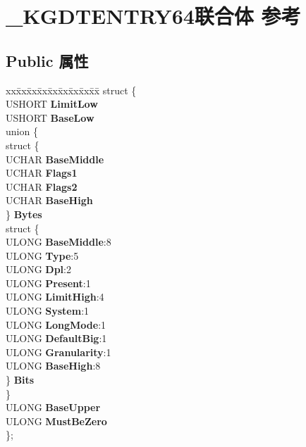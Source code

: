 \hypertarget{union___k_g_d_t_e_n_t_r_y64}{}\section{\+\_\+\+K\+G\+D\+T\+E\+N\+T\+R\+Y64联合体 参考}
\label{union___k_g_d_t_e_n_t_r_y64}
\subsection*{Public 属性}
\begin{DoxyCompactItemize}
\item 
\mbox{\label{union___k_g_d_t_e_n_t_r_y64_a58d7f2994f7a91284bcfc198b6ea5be6}} 
\begin{tabbing}
xx\=xx\=xx\=xx\=xx\=xx\=xx\=xx\=xx\=\kill
struct \{\\
\>USHORT {\bfseries LimitLow}\\
\>USHORT {\bfseries BaseLow}\\
\mbox{\label{struct___k_g_d_t_e_n_t_r_y64_1_1_0D1911_a6d7e1973afbf862eac6f044cc0b54c61}} 
\>union \{\\
\>\>struct \{\\
\>\>\>UCHAR {\bfseries BaseMiddle}\\
\>\>\>UCHAR {\bfseries Flags1}\\
\>\>\>UCHAR {\bfseries Flags2}\\
\>\>\>UCHAR {\bfseries BaseHigh}\\
\>\>\} {\bfseries Bytes}\\
\>\>struct \{\\
\>\>\>ULONG {\bfseries BaseMiddle}:8\\
\>\>\>ULONG {\bfseries Type}:5\\
\>\>\>ULONG {\bfseries Dpl}:2\\
\>\>\>ULONG {\bfseries Present}:1\\
\>\>\>ULONG {\bfseries LimitHigh}:4\\
\>\>\>ULONG {\bfseries System}:1\\
\>\>\>ULONG {\bfseries LongMode}:1\\
\>\>\>ULONG {\bfseries DefaultBig}:1\\
\>\>\>ULONG {\bfseries Granularity}:1\\
\>\>\>ULONG {\bfseries BaseHigh}:8\\
\>\>\} {\bfseries Bits}\\
\>\} \\
\>ULONG {\bfseries BaseUpper}\\
\>ULONG {\bfseries MustBeZero}\\
\}; \\


\end{tabbing}
\end{DoxyCompactItemize}

